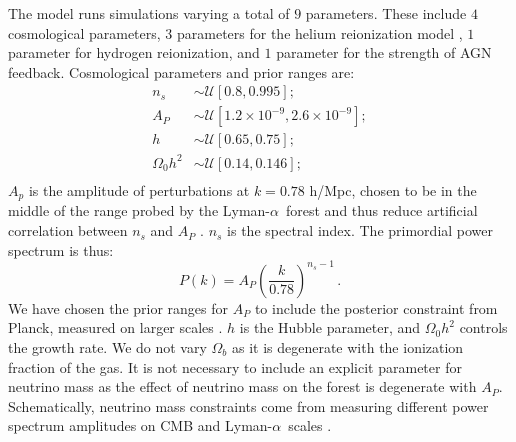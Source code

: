 \documentclass[a4paper,11pt]{article}
\newcommand{\Lya}{Lyman-$\alpha$}
\newcommand{\uniform}{\mathcal{U}}
\begin{document}

The model runs simulations varying a total of $9$ parameters. These include $4$ cosmological parameters, $3$ parameters for the helium reionization model \cite{UptonSanderbeck:2020}, $1$ parameter for hydrogen reionization, and $1$ parameter for the strength of AGN feedback. Cosmological parameters and prior ranges are:
\begin{align}
      n_s      &\sim \uniform[0.8, 0.995]; \\
      A_P      &\sim \uniform[1.2\times10^{-9}, 2.6\times10^{-9}];\\
      h        &\sim \uniform[0.65, 0.75]; \\
      \Omega_0 h^2 &\sim \uniform[0.14, 0.146];\\
   \label{eq:prior_cos_volume}
\end{align}
$A_p$ is the amplitude of perturbations at $k = 0.78$ h/Mpc, chosen to be in the middle of the range probed by the \Lya~forest and thus reduce artificial correlation between $n_s$ and $A_P$ \cite{Bird:2019}. $n_s$ is the spectral index. The primordial power spectrum is thus:
\begin{equation}
 P(k) = A_P \left(\frac{k}{ 0.78}\right)^{n_s-1}\,.
 \label{eq:pk}
\end{equation}
We have chosen the prior ranges for $A_P$ to include the posterior constraint from Planck, measured on larger scales \cite{Planck:2018}.
$h$ is the Hubble parameter, and $\Omega_0 h^2$ controls the growth rate. We do not vary $\Omega_b$ as it is degenerate with the ionization fraction of the gas. It is not necessary to include an explicit parameter for neutrino mass as the effect of neutrino mass on the forest is degenerate with $A_P$. Schematically, neutrino mass constraints come from measuring different power spectrum amplitudes on CMB and \Lya~scales \cite{Pedersen:2021}.

\end{document}
